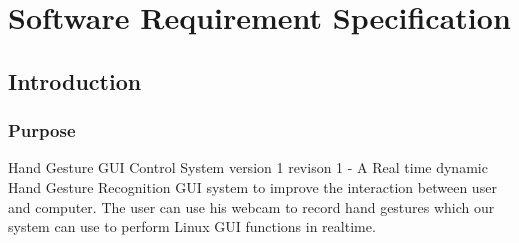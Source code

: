 \documentclass[11pt]{report}
\begin{document}
\chapter{Software Requirement Specification}

 \section{Introduction}

\subsection{Purpose}
Hand Gesture GUI Control System version 1 revison 1 - A Real time dynamic Hand Gesture Recognition GUI system to improve the interaction between user and computer. The user can use his webcam to record hand gestures which our system can use to perform Linux GUI functions in realtime.
\end{document}
